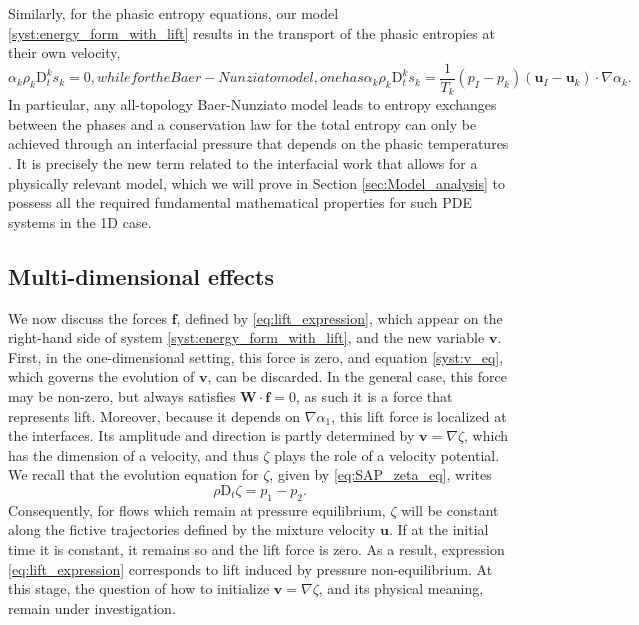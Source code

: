 \documentclass{myclass}
\newcommand{\Dt}{\mathrm{D}_t}
\newcommand{\vel}{\bm{u}}
\newcommand{\lift}{\bm{f}}
\newcommand{\pth}[1]  {\left( #1 \right)}
\begin{document}
Similarly, for the phasic entropy equations, our model \eqref{syst:energy_form_with_lift} results in the transport of the phasic entropies at their own velocity,
\begin{subequations}
\begin{equation}
\alpha_k\rho_k \Dt^k s_k = 0,
\end{equation}
while for the Baer-Nunziato model, one has
\begin{equation}
\alpha_k\rho_k \Dt^k s_k =\frac{1}{T_k}\pth{p_I-p_k}\pth{\vel_I-\vel_k}\cdot\nabla\alpha_k.
\end{equation}
\end{subequations}
In particular, any all-topology Baer-Nunziato model leads to entropy exchanges between the phases and a conservation law for the total entropy can only be achieved through an interfacial pressure that depends on the phasic temperatures \cite{gallouet:2004,muller:2016}. It is precisely the new term related to the interfacial work that allows for a physically relevant model, which we will prove in Section \mbox{\ref{sec:Model_analysis}} to possess all the required fundamental mathematical properties for such PDE systems in the 1D case.


\subsection{Multi-dimensional effects}

We now discuss the forces $\lift$, defined by \eqref{eq:lift_expression}, which appear on the right-hand side of system \eqref{syst:energy_form_with_lift}, and the new variable $\bm{v}$. First, in the one-dimensional setting, this force is zero, and equation \eqref{syst:v_eq}, which governs the evolution of $\bm{v}$, can be discarded. In the general case, this force may be non-zero, but always satisfies $\bm{W}\cdot\lift= 0$, as such it is a force that represents lift. Moreover, because it depends on $\nabla\alpha_1$, this lift force is localized at the interfaces. Its amplitude and direction is partly determined by $\bm{v}=\nabla\zeta$, which has the dimension of a velocity, and thus $\zeta$ plays the role of a velocity potential. We recall that the evolution equation for $\zeta$, given by \eqref{eq:SAP_zeta_eq}, writes
\begin{equation}
\rho\Dt\zeta = p_1 - p_2.
\end{equation}
Consequently, for flows which remain at pressure equilibrium, $\zeta$ will be constant along the fictive trajectories defined by the mixture velocity $\vel$. If at the initial time it is constant, it remains so and the lift force is zero. As a result, expression \eqref{eq:lift_expression} corresponds to lift induced by pressure non-equilibrium. At this stage, the question of how to initialize $\bm{v}=\nabla\zeta$, and its physical meaning, remain under investigation.
\end{document}
